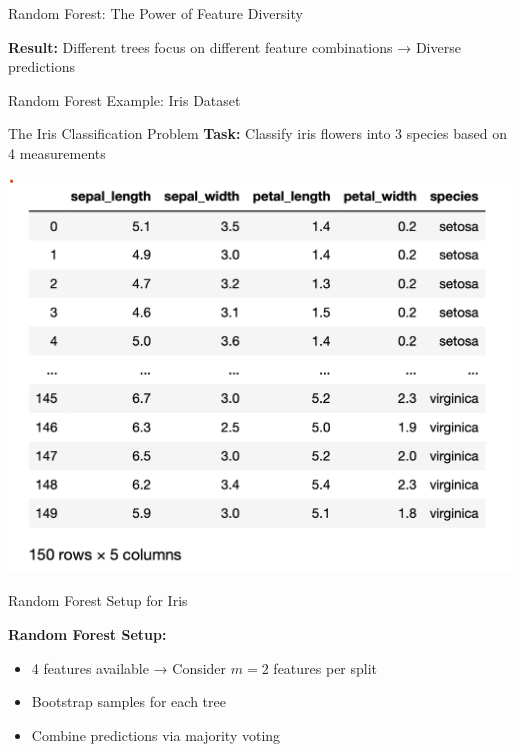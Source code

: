 \documentclass[10pt]{beamer}
\newcommand{\fitpic}[1]{\begin{adjustbox}{max width=\linewidth, max totalheight=0.78\textheight}#1\end{adjustbox}}
\begin{document}
\begin{frame}{Random Forest: The Power of Feature Diversity}
\begin{keypointsbox}
\textbf{Result:} Different trees focus on different feature combinations → Diverse predictions
\end{keypointsbox}
\end{frame}

\begin{frame}{Random Forest Example: Iris Dataset}
\begin{examplebox}{The Iris Classification Problem}
\textbf{Task:} Classify iris flowers into 3 species based on 4 measurements
\end{examplebox}

  \vspace{0.3cm}
  \centering
  \fitpic{\includegraphics[scale=0.4]{../assets/ensemble/diagrams/dataset-iris.png}}
\end{frame}

\begin{frame}{Random Forest Setup for Iris}
\begin{keypointsbox}
\textbf{Random Forest Setup:}
\begin{itemize}
\item 4 features available → Consider $m = 2$ features per split
\item Bootstrap samples for each tree
\item Combine predictions via majority voting
\end{itemize}
\end{keypointsbox}
\end{frame}
\end{document}
